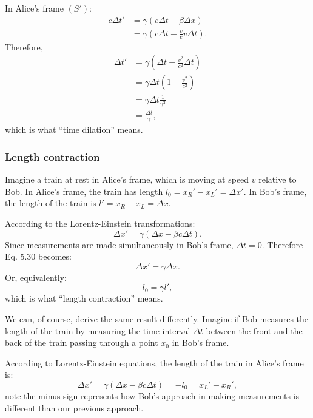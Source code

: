 \documentclass[a4paper,11pt]{article}
\numberwithin{equation}{section}
\begin{document}
 \noindent In Alice's frame $(S')$:
 \begin{equation}
 \begin{split}
 c\Delta t' &= \gamma(c\Delta t-\beta\Delta x)\\
 &= \gamma \left(c\Delta t-\frac{v}{c}v\Delta t \right). 
 \end{split}
 \end{equation}
 Therefore, 
 \begin{equation}
 \begin{split}
 \Delta t'&=\gamma\left(\Delta t-\frac{v^2}{c^2}\Delta t \right) \\
 &= \gamma\Delta t\left(1-\frac{v^2}{c^2} \right) \\
 &= \gamma\Delta t\frac{1}{\gamma^2}\\
 &= \frac{\Delta t}{\gamma},
 \end{split}
 \end{equation}
 which is what ``time dilation'' means. 
 \subsubsection{Length contraction}
 Imagine a train at rest in Alice's frame, which is moving at speed $v$ relative to Bob. In Alice's frame, the train has length $l_0 = x_R'-x_L'=\Delta x'$. In Bob's frame, the length of the train is $l'=x_R-x_L=\Delta x$.
 
 \noindent According to the Lorentz-Einstein transformations:
 \begin{equation}
 \Delta x'=\gamma(\Delta x-\beta c \Delta t).
 \end{equation}  
 Since measurements are made simultaneously in Bob's frame, $\Delta t = 0$. Therefore Eq. 5.30 becomes:
 \begin{equation}
 \Delta x' = \gamma\Delta x.
 \end{equation}
 Or, equivalently:
 \begin{equation}
 l_0=\gamma l',
 \end{equation}
 which is what ``length contraction'' means. 
 
 \noindent We can, of course, derive the same result differently. Imagine if Bob measures the length of the train by measuring the time interval $\Delta t$ between the front and the back of the train passing through a point $x_0$ in Bob's frame. 
 
 \noindent According to Lorentz-Einstein equations, the length of the train in Alice's frame is:
 \begin{equation}
 \Delta x' = \gamma(\Delta x - \beta c \Delta t) = -l_0 = x_L'-x_R',
 \end{equation}
 note the minus sign represents how Bob's approach in making measurements is different than our previous approach. 
 
\end{document}
